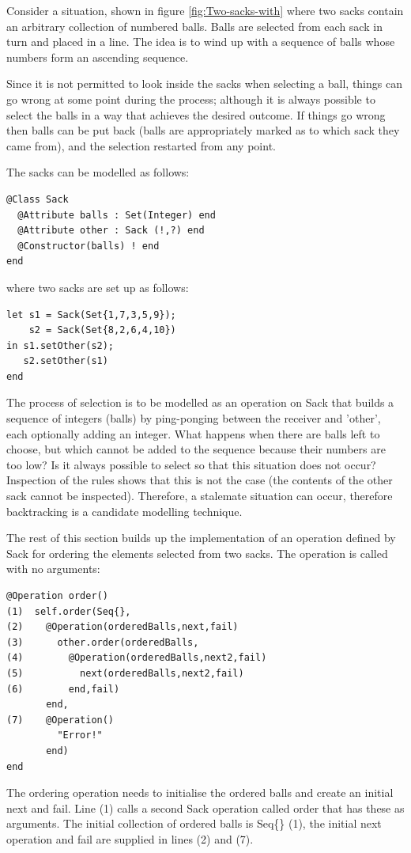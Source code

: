 Consider a situation, shown in figure \ref{fig:Two-sacks-with} where
two sacks contain an arbitrary collection of numbered balls. Balls
are selected from each sack in turn and placed in a line. The idea
is to wind up with a sequence of balls whose numbers form an ascending
sequence.

Since it is not permitted to look inside the sacks when selecting
a ball, things can go wrong at some point during the process; although
it is always possible to select the balls in a way that achieves the
desired outcome. If things go wrong then balls can be put back (balls
are appropriately marked as to which sack they came from), and the
selection restarted from any point.

The sacks can be modelled as follows:

\begin{lstlisting}
@Class Sack
  @Attribute balls : Set(Integer) end
  @Attribute other : Sack (!,?) end
  @Constructor(balls) ! end
end
\end{lstlisting}where two sacks are set up as follows:

\begin{lstlisting}
let s1 = Sack(Set{1,7,3,5,9});
    s2 = Sack(Set{8,2,6,4,10})
in s1.setOther(s2);
   s2.setOther(s1)
end
\end{lstlisting}The process of selection is to be modelled as an operation on Sack
that builds a sequence of integers (balls) by ping-ponging between
the receiver and 'other', each optionally adding an integer. What
happens when there are balls left to choose, but which cannot be added
to the sequence because their numbers are too low? Is it always possible
to select so that this situation does not occur? Inspection of the
rules shows that this is not the case (the contents of the other sack
cannot be inspected). Therefore, a stalemate situation can occur,
therefore backtracking is a candidate modelling technique.

The rest of this section builds up the implementation of an operation
defined by Sack for ordering the elements selected from two sacks.
The operation is called with no arguments:

\begin{lstlisting}
@Operation order()
(1)  self.order(Seq{},
(2)    @Operation(orderedBalls,next,fail) 
(3)      other.order(orderedBalls, 
(4)        @Operation(orderedBalls,next2,fail) 
(5)          next(orderedBalls,next2,fail) 
(6)        end,fail) 
       end,
(7)    @Operation() 
         "Error!" 
       end)
end
\end{lstlisting}The ordering operation needs to initialise the ordered balls and create
an initial next and fail. Line (1) calls a second Sack operation called
order that has these as arguments. The initial collection of ordered
balls is Seq\{\} (1), the initial next operation and fail are supplied
in lines (2) and (7).


